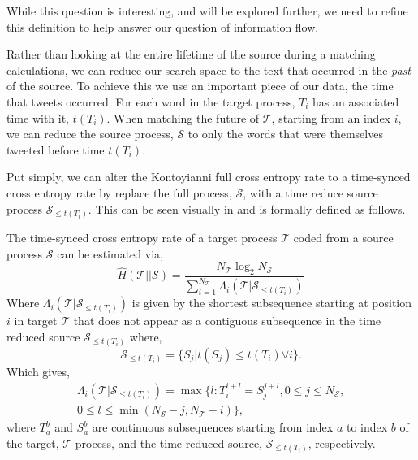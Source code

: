 While this question is interesting, and will be explored further, we need to refine this definition to help answer our question of information flow.

Rather than looking at the entire lifetime of the source during a matching calculations, we can reduce our search space to the text that occurred in the \emph{past} of the source. To achieve this we use an important piece of our data, the time that tweets occurred. For each word in the target process, $T_i$ has an associated time with it, $t(T_i)$. When matching the future of $\mathcal{T}$, starting from an index $i$, we can reduce the source process, $\mathcal{S}$ to only the words that were themselves tweeted before time $t(T_i)$. 

Put simply, we can alter the Kontoyianni full cross entropy rate to a time-synced cross entropy rate by replace the full {\color{source}} process, $\mathcal{S}$, with a time reduce source process $\mathcal{S}_{ \leq t(T_i)}$. This can be seen visually in  and is formally defined as follows.

\begin{definition}
	The time-synced cross entropy rate of a {\color{target} target process} $\mathcal{T}$ coded from a {\color{source} source process} $\mathcal{S}$ can be estimated via,
	\begin{equation}
	\hat{H}(\mathcal{T} || \mathcal{S})=\frac{N_{\mathcal{T}} \log _{2} N_{\mathcal{S}}}{\sum_{i=1}^{N_{\mathcal{T}}} \Lambda_{i}(\mathcal{T}| \mathcal{S}_{\leq t(T_i) } )}
	\end{equation}
	Where $\Lambda_{i}(\mathcal{T}| \mathcal{S}_{\leq t(T_i) })$ is given by the shortest subsequence starting at position $i$ in {\color{target}target} $\mathcal{T}$ that does not appear as a contiguous subsequence in the time reduced {\color{source}source} $\mathcal{S}_{\leq t(T_i) }$ where,
	\begin{equation}
	\mathcal{S}_{\leq t(T_i) } = \{S_j | t(S_j) \leq t(T_i) \forall i \}.
	\end{equation}
	Which gives,
	\begin{align*}
	\Lambda_{i}(\mathcal{T}| \mathcal{S}_{\leq t(T_i)}) = \max \{l: T_i^{i+l}=S_{j}^{j+l}, 0 \leq j \leq N_{\mathcal{S}},  \\  0 \leq l \leq \min( N_{\mathcal{S}}- j , N_{\mathcal{T}}- i ) \},
	\end{align*}
	where $T_a^{b}$ and $S_a^b$ are continuous subsequences starting from index $a$ to index $b$ of the {\color{target} target}, $\mathcal{T}$ process, and the time reduced {\color{source} source}, $\mathcal{S}_{\leq t(T_i)}$, respectively.
\end{definition}
 
